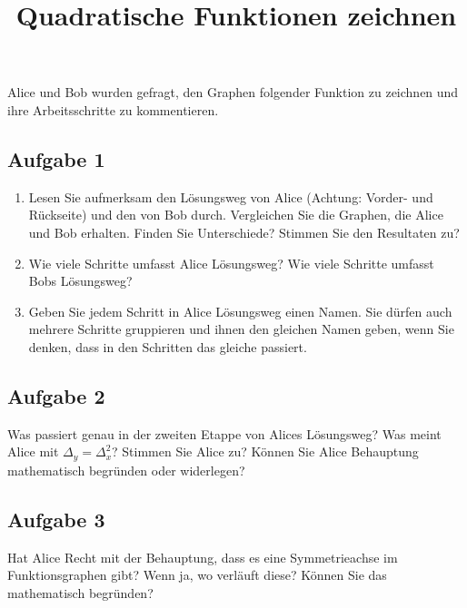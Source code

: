 \documentclass{article}
\title{Quadratische Funktionen zeichnen}
\date{\vspace{-7ex}}
\begin{document}
\maketitle
{}
Alice und Bob wurden gefragt, den Graphen folgender Funktion zu zeichnen und ihre Arbeitsschritte zu kommentieren.
\subsection*{Aufgabe 1}
\begin{enumerate}[label=\alph*)]
\item Lesen Sie aufmerksam den Lösungsweg von Alice (Achtung: Vorder- und Rückseite) und den von Bob durch. Vergleichen Sie die Graphen, die Alice und Bob erhalten. Finden Sie Unterschiede? Stimmen Sie den Resultaten zu?
\item Wie viele Schritte umfasst Alice Lösungsweg? Wie viele Schritte umfasst Bobs Lösungsweg?
\item Geben Sie jedem Schritt in Alice Lösungsweg einen Namen. Sie dürfen auch mehrere Schritte gruppieren und ihnen den gleichen Namen geben, wenn Sie denken, dass in den Schritten das gleiche passiert.
\end{enumerate}

\subsection*{Aufgabe 2}
Was passiert genau in der zweiten Etappe von Alices Lösungsweg? Was meint Alice mit $\Delta_y = \Delta_x^2$? Stimmen Sie Alice zu? Können Sie Alice Behauptung mathematisch begründen oder widerlegen?

\subsection*{Aufgabe 3}
Hat Alice Recht mit der Behauptung, dass es eine Symmetrieachse im Funktionsgraphen gibt? Wenn ja, wo verläuft diese? Können Sie das mathematisch begründen?
\end{document}
